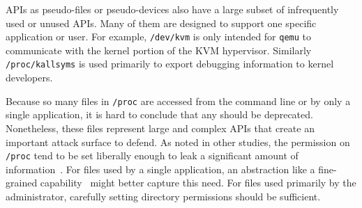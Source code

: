 
APIs as pseudo-files or pseudo-devices also have a large subset
of infrequently used or unused APIs.
Many of them
are designed to support one specific application or user.
For example, {\tt /dev/kvm} is only intended for {\tt qemu} to
communicate with the kernel portion of the KVM hypervisor.
Similarly {\tt /proc/kallsyms} is used primarily to export debugging information to kernel developers.

Because so many files in {\tt /proc} are accessed from the command line
or by only a single application, it is hard to conclude that any should be deprecated.
Nonetheless, these files represent large and complex APIs that create an important attack surface to defend.
As noted in other studies, the permission on {\tt /proc} tend to be
set liberally enough to leak a  significant amount of information~\citep{memento}.
For files used by a single application, an abstraction like a fine-grained capability~\citep{shapiro99eros}
might better capture this need.  
For files used primarily by the administrator,
carefully setting directory permissions should be sufficient.




